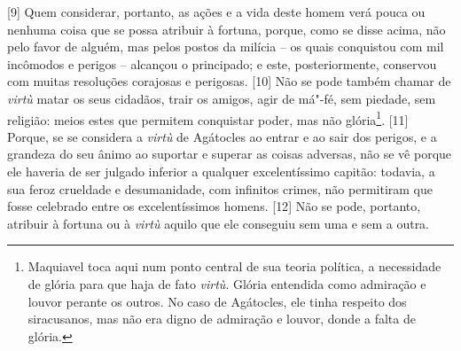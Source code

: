 {[}9{]} Quem considerar, portanto, as ações e a vida deste homem verá
pouca ou nenhuma coisa que se possa atribuir à fortuna, porque, como se
disse acima, não pelo favor de alguém, mas pelos postos da milícia -- os
quais conquistou com mil incômodos e perigos -- alcançou o principado; e
este, posteriormente, conservou com muitas resoluções corajosas e
perigosas. {[}10{]} Não se pode também chamar de \emph{virtù} matar os
seus cidadãos, trair os amigos, agir de má"-fé, sem piedade, sem
religião: meios estes que permitem conquistar poder, mas não
glória\footnote{Maquiavel toca aqui num ponto central de sua teoria
  política, a necessidade de glória para que haja de fato \emph{virtù}.
  Glória entendida como admiração e louvor perante os outros. No caso de
  Agátocles, ele tinha respeito dos siracusanos, mas não era digno de
  admiração e louvor, donde a falta de glória.}. {[}11{]} Porque, se se
considera a \emph{virtù} de Agátocles ao entrar e ao sair dos perigos, e
a grandeza do seu ânimo ao suportar e superar as coisas adversas, não se
vê porque ele haveria de ser julgado inferior a qualquer excelentíssimo
capitão: todavia, a sua feroz crueldade e desumanidade, com infinitos
crimes, não permitiram que fosse celebrado entre os excelentíssimos
homens. {[}12{]} Não se pode, portanto, atribuir à fortuna ou à
\emph{virtù} aquilo que ele conseguiu sem uma e sem a outra.

